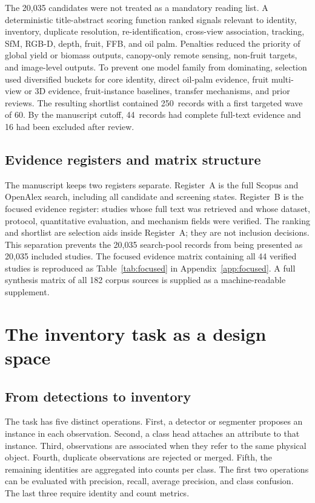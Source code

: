 The 20,035 candidates were not treated as a mandatory reading list. A deterministic title-abstract scoring function ranked signals relevant to identity, inventory, duplicate resolution, re-identification, cross-view association, tracking, SfM, RGB-D, depth, fruit, FFB, and oil palm. Penalties reduced the priority of global yield or biomass outputs, canopy-only remote sensing, non-fruit targets, and image-level outputs. To prevent one model family from dominating, selection used diversified buckets for core identity, direct oil-palm evidence, fruit multi-view or 3D evidence, fruit-instance baselines, transfer mechanisms, and prior reviews. The resulting shortlist contained 250~records with a first targeted wave of 60. By the manuscript cutoff, 44~records had complete full-text evidence and 16 had been excluded after review.

\subsection{Evidence registers and matrix structure}

The manuscript keeps two registers separate. Register~A is the full Scopus and OpenAlex search, including all candidate and screening states. Register~B is the focused evidence register: studies whose full text was retrieved and whose dataset, protocol, quantitative evaluation, and mechanism fields were verified. The ranking and shortlist are selection aids inside Register~A; they are not inclusion decisions. This separation prevents the 20,035 search-pool records from being presented as 20,035 included studies. The focused evidence matrix containing all 44 verified studies is reproduced as Table~\ref{tab:focused} in Appendix~\ref{app:focused}. A full synthesis matrix of all 182 corpus sources is supplied as a machine-readable supplement.

\section{The inventory task as a design space}
\label{sec:designspace}

\subsection{From detections to inventory}

The task has five distinct operations. First, a detector or segmenter proposes an instance in each observation. Second, a class head attaches an attribute to that instance. Third, observations are associated when they refer to the same physical object. Fourth, duplicate observations are rejected or merged. Fifth, the remaining identities are aggregated into counts per class. The first two operations can be evaluated with precision, recall, average precision, and class confusion. The last three require identity and count metrics.

